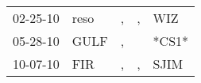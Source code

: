 \begin{supertabular}{lllll}
 02-25-10 &  reso &  , &  , &    WIZ \\
 05-28-10 &  GULF &  , &    &  *CS1* \\
 10-07-10 &   FIR &  , &  , &   SJIM \\
\end{supertabular}
